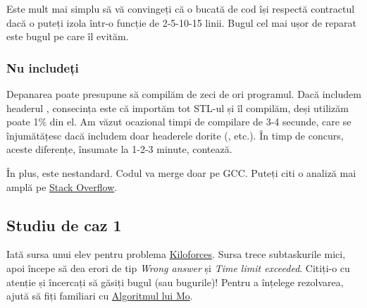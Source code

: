 \documentclass[../main.tex]{subfiles}
\begin{document}
Este mult mai simplu să vă convingeți că o bucată de cod își respectă contractul dacă o puteți izola într-o funcție de 2-5-10-15 linii. Bugul cel mai ușor de reparat este bugul pe care îl evităm.

\subsubsection*{Nu includeți }

Depanarea poate presupune să compilăm de zeci de ori programul. Dacă includem headerul , consecința este că importăm tot STL-ul și îl compilăm, deși utilizăm poate 1\% din el. Am văzut ocazional timpi de compilare de 3-4 secunde, care se înjumătățesc dacă includem doar headerele dorite (,  etc.). În timp de concurs, aceste diferențe, însumate la 1-2-3 minute, contează.

În plus,  este nestandard. Codul va merge doar pe GCC. Puteți citi o analiză mai amplă pe \href{https://stackoverflow.com/a/31816096/6022817}{Stack Overflow}.


\subsection{Studiu de caz 1}

Iată sursa unui elev pentru problema \href{https://kilonova.ro/problems/2021}{Kiloforces}. Sursa trece subtaskurile mici, apoi începe să dea erori de tip \textit{Wrong answer} și \textit{Time limit exceeded}. Citiți-o cu atenție și încercați să găsiți bugul (sau bugurile)! Pentru a înțelege rezolvarea, ajută să fiți familiari cu \hyperref[chapter:mo]{Algoritmul lui Mo}.
\end{document}
